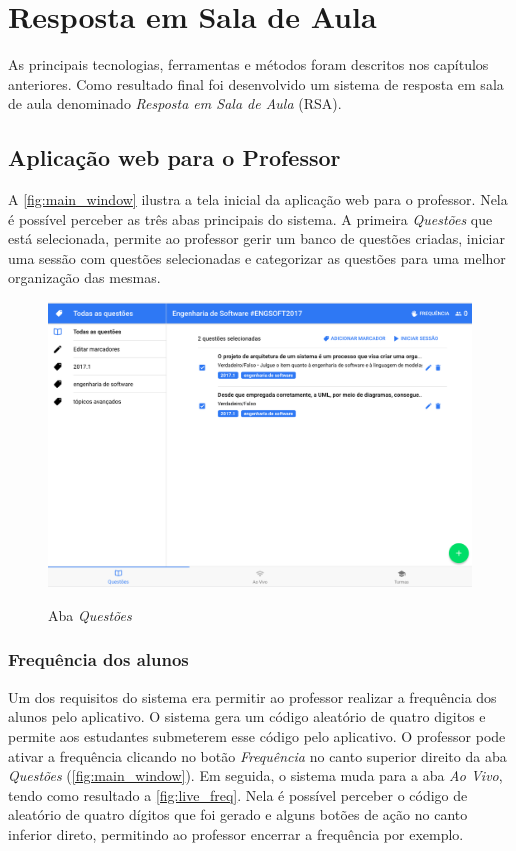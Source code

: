 \chapter{Resposta em Sala de Aula}\label{chap:rsa}

As principais tecnologias, ferramentas e métodos foram descritos nos capítulos
anteriores. Como resultado final foi desenvolvido um sistema de resposta
em sala de aula denominado \textit{Resposta em Sala de Aula} (RSA).

\section{Aplicação web para o Professor}

A \autoref{fig:main_window} ilustra a tela inicial da aplicação web para o professor.
Nela é possível perceber as três abas principais do sistema. A primeira \textit{Questões} que
está selecionada, permite ao professor gerir um banco de questões criadas, iniciar uma
sessão com questões selecionadas e categorizar as questões para uma melhor organização das mesmas.

\begin{figure}[ht]
  \centering
  \caption{Aba \textit{Questões}}
  \includegraphics[scale=.40]{imagens/telas/main_window}
  \doautor
  \label{fig:main_window}
\end{figure}

\subsection{Frequência dos alunos}
\label{sec:freq_students}

Um dos requisitos do sistema era permitir ao professor realizar a frequência dos alunos
pelo aplicativo. O sistema gera um código aleatório de quatro digitos e permite aos estudantes
submeterem esse código pelo aplicativo. O professor pode ativar a frequência
clicando no botão \textit{Frequência} no canto superior direito da aba \textit{Questões} (\autoref{fig:main_window}).
Em seguida, o sistema muda para a aba \textit{Ao Vivo}, tendo como resultado a \autoref{fig:live_freq}.
Nela é possível perceber o código de aleatório de quatro dígitos que foi gerado e alguns botões de ação no canto
inferior direto, permitindo ao professor encerrar a frequência por exemplo.

